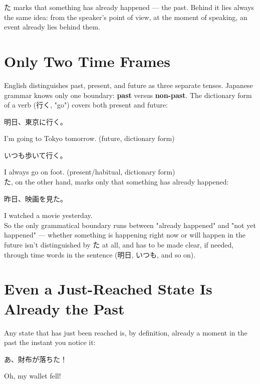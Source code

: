 \documentclass[12pt]{book}
\begin{document}
た marks that something has already happened — the past. Behind it lies always the same idea: from the speaker's point of view, at the moment of speaking, an event already lies behind them.

\section*{Only Two Time Frames}

English distinguishes past, present, and future as three separate tenses. Japanese grammar knows only one boundary: \textbf{past} versus \textbf{non-past}. The dictionary form of a verb (行く, "go") covers both present and future:

\par\quad 明日、東京に行く。\\
\par\quad I'm going to Tokyo tomorrow. (future, dictionary form)\\

\par\quad いつも歩いて行く。\\
\par\quad I always go on foot. (present/habitual, dictionary form)\\

た, on the other hand, marks only that something has already happened:

\par\quad 昨日、映画を見た。\\
\par\quad I watched a movie yesterday.\\

So the only grammatical boundary runs between "already happened" and "not yet happened" — whether something is happening right now or will happen in the future isn't distinguished by た at all, and has to be made clear, if needed, through time words in the sentence (明日, いつも, and so on).

\section*{Even a Just-Reached State Is Already the Past}

Any state that has just been reached is, by definition, already a moment in the past the instant you notice it:

\par\quad あ、財布が落ちた！\\
\par\quad Oh, my wallet fell!\\
\end{document}
